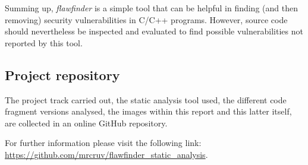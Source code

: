 Summing up, \textit{flawfinder} is a simple tool that can be helpful in finding (and then removing) security vulnerabilities in C/C++ programs.
However, source code should nevertheless be inspected and evaluated to find possible vulnerabilities not reported by this tool.

\subsection{Project repository}
The project track carried out, the static analysis tool used, the different code fragment versions analysed, the images within this report and this latter itself, are collected in an online GitHub\parencite{github} repository.

For further information please visit the following link: \href{https://github.com/mrcruv/flawfinder_static_analysis}{https://github.com/mrcruv/flawfinder\_static\_analysis}.
